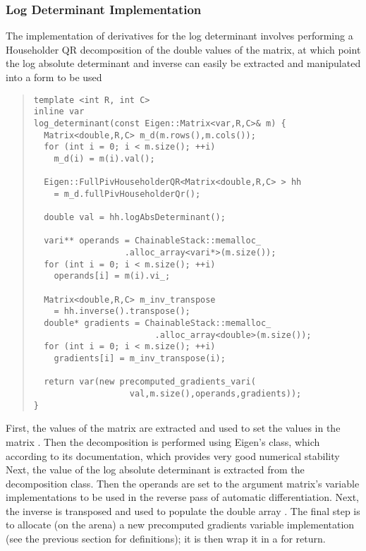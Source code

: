 \documentclass[10pt]{article}
\begin{document}
\subsubsection{Log Determinant Implementation}

The implementation of derivatives for the log determinant involves
performing a Householder QR decomposition of the double values of the
matrix, at which point the log absolute determinant and inverse can
easily be extracted and manipulated into a form to be used

\begin{quote}
\begin{Verbatim}
template <int R, int C>
inline var 
log_determinant(const Eigen::Matrix<var,R,C>& m) {
  Matrix<double,R,C> m_d(m.rows(),m.cols());
  for (int i = 0; i < m.size(); ++i)
    m_d(i) = m(i).val();

  Eigen::FullPivHouseholderQR<Matrix<double,R,C> > hh
    = m_d.fullPivHouseholderQr();

  double val = hh.logAbsDeterminant();

  vari** operands = ChainableStack::memalloc_
                  .alloc_array<vari*>(m.size());
  for (int i = 0; i < m.size(); ++i)
    operands[i] = m(i).vi_;

  Matrix<double,R,C> m_inv_transpose 
    = hh.inverse().transpose();
  double* gradients = ChainableStack::memalloc_
                        .alloc_array<double>(m.size());
  for (int i = 0; i < m.size(); ++i)
    gradients[i] = m_inv_transpose(i);

  return var(new precomputed_gradients_vari(
                   val,m.size(),operands,gradients));
}
\end{Verbatim}
\end{quote}
%
First, the values of the  matrix are extracted and used to
set the values in the  matrix .  Then the
decomposition is performed using Eigen's 
class, which according to its documentation, which provides very good
numerical stability \citep[Section~5.1]{GolubVanLoan:96} Next, the value
of the log absolute determinant is extracted from the decomposition
class.  Then the operands are set to the argument matrix's variable
implementations to be used in the reverse pass of automatic
differentiation.  Next, the inverse is transposed and used to populate
the double array .  The final step is to allocate (on
the arena) a new precomputed gradients variable implementation (see
the previous section for definitions); it is then wrap it in a
 for return.
 
\end{document}
